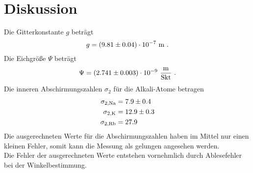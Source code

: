 \section{Diskussion}
\label{sec:Diskussion}
Die Gitterkonstante $g$ beträgt
\begin{align*}
  g = (\num{9.81 +- 0.04}) \cdot 10^{-7}\ \text{m} \ .
\end{align*}
Die Eichgröße $\Psi$ beträgt
\begin{align*}
  \Psi = (\num{2.741 +- 0.003}) \cdot 10^{-9}\ \frac{\text{m}}{\text{Skt}} \ .
\end{align*}
Die inneren Abschirmungszahlen $\sigma_2$ für die Alkali-Atome betragen
\begin{align*}
  \sigma_{2,\text{Na}} & = \num{7.9 +- 0.4} \\
  \sigma_{2,\text{K}}  & = \num{12.9 +- 0.3} \\
  \sigma_{2,\text{Rb}} & = 27.9
\end{align*}
Die ausgerechneten Werte für die Abschirmungszahlen haben im Mittel nur einen kleinen Fehler, somit kann die Messung als gelungen angesehen werden. \\
Die Fehler der ausgerechneten Werte entstehen vornehmlich durch Ablesefehler bei der Winkelbestimmung.
